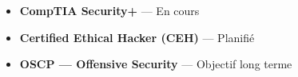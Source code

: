 \documentclass[10pt, a4paper]{article}
\begin{document}
\begin{minipage}[t]{0.67\textwidth}
\begin{minipage}[t]{0.94\linewidth}
\begin{itemize}[label={\color{accent}}]
  \item {\fontsize{9}{11}\selectfont\color{maintext}\textbf{CompTIA Security+}}
        {\fontsize{8}{10}\selectfont\color{muted} --- En cours}
  \item {\fontsize{9}{11}\selectfont\color{maintext}\textbf{Certified Ethical Hacker (CEH)}}
        {\fontsize{8}{10}\selectfont\color{muted} --- Planifié}
  \item {\fontsize{9}{11}\selectfont\color{maintext}\textbf{OSCP --- Offensive Security}}
        {\fontsize{8}{10}\selectfont\color{muted} --- Objectif long terme}
\end{itemize}

\end{minipage}
\end{minipage}
\end{document}
